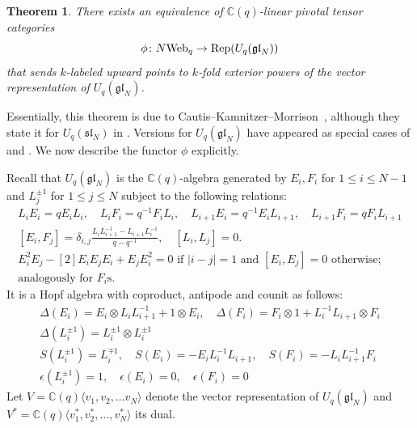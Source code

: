 \documentclass[11pt]{article}
\newtheorem{theo}{Theorem}[section]
\theoremstyle{definition}
\numberwithin{equation}{section}
\newcommand{\slnn}[1]{\mf{sl}_{#1}}
\newcommand{\glnn}[1]{\mf{gl}_{#1}}
\def\mf{\mathfrak}
\def\C{{\mathbb C}}
\newcommand{\Rep}{\cat{Rep}}
\newcommand{\cat}[1]{\ensuremath{\mbox{\bfseries {\upshape {#1}}}}}
\newcommand{\Webq}[1][]{#1\cat{Web}_{q}}
\begin{document}
\begin{theo}\label{thm:CKM} There exists an equivalence of $\C(q)$-linear pivotal tensor categories
\[\phi \colon \Webq[N] \to \Rep(U_q(\glnn{N}))\]
that sends $k$-labeled upward points to $k$-fold exterior powers of the vector representation of $U_q(\glnn{N})$.
\end{theo}
Essentially, this theorem is due to Cautis--Kamnitzer--Morrison~\cite{CKM},
although they state it for $U_q(\slnn{N})$ in \cite[Theorem 3.3.1]{CKM}.
Versions for $U_q(\glnn{N})$ have appeared as special cases of \cite[Main Theorem A]{QS2} and \cite[Theorem 3.20]{TVW}. We now describe the functor $\phi$
explicitly.

Recall that $U_q(\glnn{N})$ is the $\C(q)$-algebra generated by $E_i,F_i$ for $1\leq i \leq N-1$ and $L^{\pm 1}_j$ for $1\leq j \leq N$ subject to the following relations:
\begin{gather}
L_i E_i=q E_i L_i,\quad L_iF_i=q^{-1}F_iL_i,\quad L_{i+1} E_i=q^{-1} E_iL_{i+1},\quad L_{i+1}F_i=q F_i L_{i+1}
\\
[E_i,F_j]=\delta_{i,j} \frac{L_iL_{i+1}^{-1}-L_{i+1}L_{i}^{-1}}{q-q^{-1}},\quad [L_i,L_j]=0.
\\
E_i^2 E_j -[2] E_i E_j E_i + E_j E_i^2 =0 \text{ if } |i-j|=1  \text{ and } [E_i,E_j]=0 \text{ otherwise;}
\\
\text{analogously for $F_i$s}. \nonumber
\end{gather}
It is a Hopf algebra with coproduct, antipode and counit as follows:
\begin{gather*}
  \Delta(E_i)=E_i\otimes L_iL_{i+1}^{-1} +1\otimes E_i, \quad \Delta(F_i)=F_i\otimes 1 +L_i^{-1}L_{i+1}\otimes F_i \\
  \Delta(L_i^{\pm 1})=L_i^{\pm 1}\otimes L_i^{\pm 1}\\
S(L_i^{\pm 1})=L_i^{\mp 1}, \quad S(E_i)=-E_i L_i^{-1}L_{i+1}, \quad S(F_i)= - L_iL_{i+1}^{-1}F_i \\
\epsilon(L_i^{\pm 1})= 1, \quad \epsilon(E_i)=0, \quad \epsilon(F_i)=0
\end{gather*}
Let $V=\C(q)\langle v_1,v_2,\dots v_N\rangle$ denote the vector representation of $U_q(\glnn{N})$ and $V^*=\C(q)\langle v_1^*,v_2^*,\dots,v_N^* \rangle$ its dual. 
\end{document}
